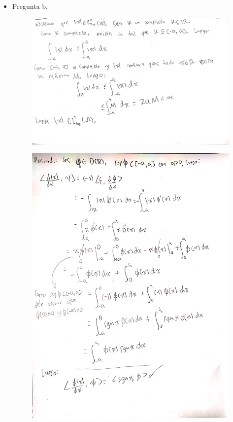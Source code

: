 \documentclass[fleqn]{article}
\begin{document}
\begin{enumerate}
\begin{itemize}
         \item Pregunta b.
           \begin{figure}[H]
             \centering \includegraphics[scale=.5]{figs/2b1}
           \end{figure}
           \begin{figure}[H]
             \centering \includegraphics[scale=.5]{figs/2b2}
           \end{figure}
       \end{itemize}


\end{enumerate}
\end{document}
